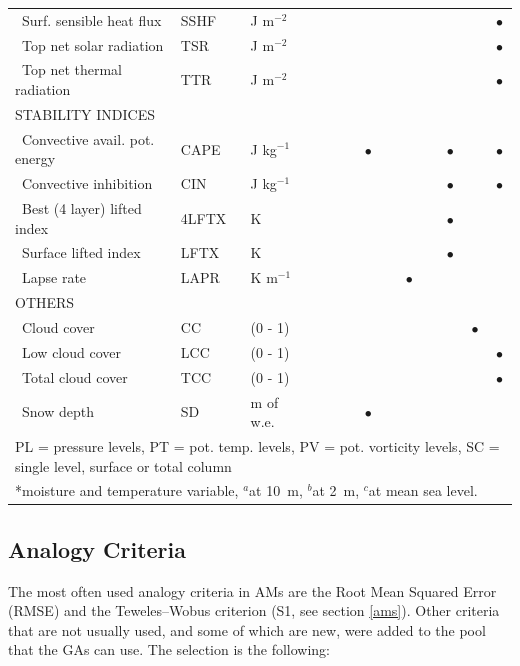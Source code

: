 \documentclass[draft]{agujournal2019}
\begin{document}
\begin{table}
{\begin{tabular}{lll|cccc|cccc|cc}
		\ Surf. sensible heat flux & SSHF & J m$^{-2}$ &  &  &  &  &  &  &  & & & $\bullet$ \\
		\ Top net solar radiation & TSR & J m$^{-2}$ &  &  &  &  &  &  &  & & & $\bullet$ \\
		\ Top net thermal radiation & TTR & J m$^{-2}$ &  &  &  &  &  &  &  & & & $\bullet$ \\
		\hline
		\multicolumn{3}{l|}{\uppercase{Stability indices}} & & & & & & & & & & \\
		\ Convective avail. pot. energy & CAPE & J kg$^{-1}$ &  &  &  & $\bullet$ &  &  &  & $\bullet$ & & $\bullet$ \\
		\ Convective inhibition & CIN & J kg$^{-1}$ &  &  &  &  &  &  &  & $\bullet$ & & $\bullet$ \\
		\ Best (4 layer) lifted index & 4LFTX & K &  &  &  &  &  &  &  & $\bullet$ & & \\
		\ Surface lifted index & LFTX & K &  &  &  &  &  &  &  & $\bullet$ & & \\
		\ Lapse rate & LAPR & K m$^{-1}$ &  &  &  &  &  & $\bullet$ &  &  & & \\
		\hline
		\multicolumn{3}{l|}{\uppercase{Others}} & & & & & & & & & & \\
		\ Cloud cover & CC & (0 - 1) &  &  &  &  &  &  &  &  & $\bullet$ & \\
		\ Low cloud cover & LCC & (0 - 1) &  &  &  &  &  &  &  &  & & $\bullet$ \\
		\ Total cloud cover & TCC & (0 - 1) &  &  &  &  &  &  &  &  &  & $\bullet$ \\
		\ Snow depth & SD & m of w.e. &  &  &  & $\bullet$ &  &  &  &  & & \\
		\hline
		\multicolumn{13}{l}{PL = pressure levels, PT = pot. temp. levels, PV = pot. vorticity levels, SC = single level, surface or total column} \\
		\multicolumn{13}{l}{*moisture and temperature variable, $^{a}$at 10~m, $^{b}$at 2~m, $^{c}$at mean sea level.}\\
		\hline 
	\end{tabular}}
	\label{list_variables}
\end{table}


\subsection{Analogy Criteria}
\label{criteria}

The most often used analogy criteria in AMs are the Root Mean Squared Error (RMSE) and the Teweles--Wobus criterion (S1, see section \ref{ams}). Other criteria that are not usually used, and some of which are new, were added to the pool that the GAs can use. The selection is the following:
\end{document}
